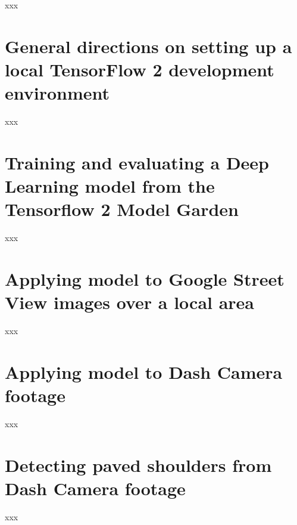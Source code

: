 \documentclass[11pt,twoside]{report}
\begin{document}
xxx

\chapter{General directions on setting up a local TensorFlow 2 development environment}
\label{a:setupenv}

xxx

\chapter{Training and evaluating a Deep Learning model from the Tensorflow 2 Model Garden}
\label{a:tensorflow_training}

xxx

\chapter{Applying model to Google Street View images over a local area}
\label{a:apply_gsv}

xxx

\chapter{Applying model to Dash Camera footage}
\label{a:apply_dashcam}

xxx

\chapter{Detecting paved shoulders from Dash Camera footage}
\label{a:lane_detection}

xxx

\cleardoublepage


\end{document}

